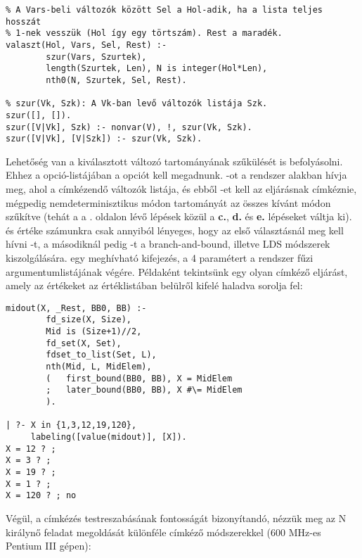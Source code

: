 \begin{verbatim}
% A Vars-beli változók között Sel a Hol-adik, ha a lista teljes hosszát
% 1-nek vesszük (Hol így egy törtszám). Rest a maradék.
valaszt(Hol, Vars, Sel, Rest) :-
        szur(Vars, Szurtek),
        length(Szurtek, Len), N is integer(Hol*Len),
        nth0(N, Szurtek, Sel, Rest).

% szur(Vk, Szk): A Vk-ban levő változók listája Szk.
szur([], []).
szur([V|Vk], Szk) :- nonvar(V), !, szur(Vk, Szk).
szur([V|Vk], [V|Szk]) :- szur(Vk, Szk).
\end{verbatim}

\label{value:enum}
Lehetőség van a kiválasztott változó tartományának szűkülését is befolyásolni. Ehhez a
 opció-listájában a  opciót kell megadnunk. -ot
a rendszer  alakban hívja meg, ahol \cd{[X|Rest]} a címkézendő
változók listája, és ebből -et kell az eljárásnak címkéznie, mégpedig
nemdeterminisztikus módon  tartományát az összes kívánt módon szűkítve (tehát
a  a \pageref{labeling:lepesek}. oldalon lévő lépések közül a
{\bf c.}, {\bf d.} és {\bf e.} lépéseket váltja ki).  és  értéke számunkra
csak annyiból lényeges, hogy az első választásnál meg kell hívni -t,
a másodiknál pedig -t a branch-and-bound, illetve LDS módszerek
kiszolgálására.  egy meghívható kifejezés, a 4 paramétert a rendszer fűzi 
argumentumlistájának végére. Példaként tekintsünk egy olyan címkéző eljárást, amely
az értékeket az értéklistában belülről kifelé haladva sorolja fel:

\begin{verbatim}
midout(X, _Rest, BB0, BB) :-
        fd_size(X, Size),
        Mid is (Size+1)//2,
        fd_set(X, Set),
        fdset_to_list(Set, L),
        nth(Mid, L, MidElem),
        (   first_bound(BB0, BB), X = MidElem
        ;   later_bound(BB0, BB), X #\= MidElem
        ).

| ?- X in {1,3,12,19,120},
     labeling([value(midout)], [X]).
X = 12 ? ;
X = 3 ? ;
X = 19 ? ;
X = 1 ? ;
X = 120 ? ; no
\end{verbatim}

Végül, a címkézés testreszabásának fontosságát bizonyítandó, nézzük meg az N királynő
feladat megoldását különféle címkéző módszerekkel (600 MHz-es Pentium III gépen):

